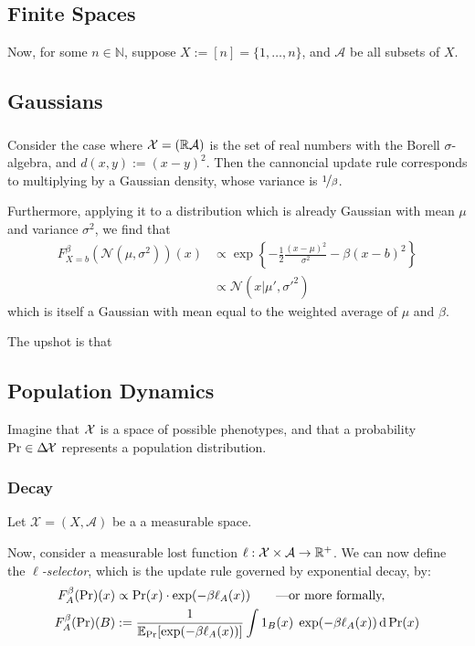 \documentclass{article}
\begin{document}
\subsection{Finite Spaces}
Now, for some $n \in \mathbb N$, suppose $X := [n] = \{1, \ldots, n\}$, and $\mathcal A$ be all subsets of $X$.

\subsection{Gaussians}
\subsubsection{}
Consider the case where $\mathcal X = (\mathbb R \mathcal A)$ is the set of real numbers with the Borell $\sigma$-algebra, and $d(x,y) := (x-y)^2$.
Then the cannoncial update rule corresponds to multiplying by a Gaussian density, whose variance is $\nicefrac1\beta$.

Furthermore, applying it to a distribution which is already Gaussian with mean $\mu$ and variance $\sigma^2$, we find that
\begin{align*}
    F^{\beta}_{X=b}(\mathcal N(\mu, \sigma^2))(x) &\propto
        \exp\left\{ - \frac12 \frac{(x-\mu)^2}{ \sigma^2 } - \beta(x-b)^2\right\}
    \\&\propto \mathcal N(x| \mu', \sigma'^2)
\end{align*}
which is itself a Gaussian with mean equal to the weighted average of $\mu$ and $\beta$.

The upshot is that

\subsection{Population Dynamics}
Imagine that $\mathcal X$ is a space of possible phenotypes, and that a probability $\Pr \in \Delta\!\mathcal X$ represents a population distribution.

\subsubsection{Decay}
Let $\mathcal X = (X, \mathcal A)$ be a a measurable space.



Now, consider a measurable lost function
$\ell: \mathcal X\times\mathcal A \to \mathbb R^+$.
We can now define the \emph{$\ell$-selector}, which is the
update rule governed by exponential decay, by:
\def\cost#1#2{\ell_{#2}(#1)}
\begin{align*}
    F^\beta_A(\Pr)(x) &\propto \Pr(x) \cdot \exp(-\beta \cost xA)
        \qquad\text{---or more formally,}\\
    F^\beta_A(\Pr)(B) &:=  \frac{1}{\Ex_{\Pr}[\exp(-\beta \cost xA )]}
        \int 1_B(x) \; \exp(-\beta \cost xA ) \,\mathrm d\Pr(x)
\end{align*}
\end{document}
